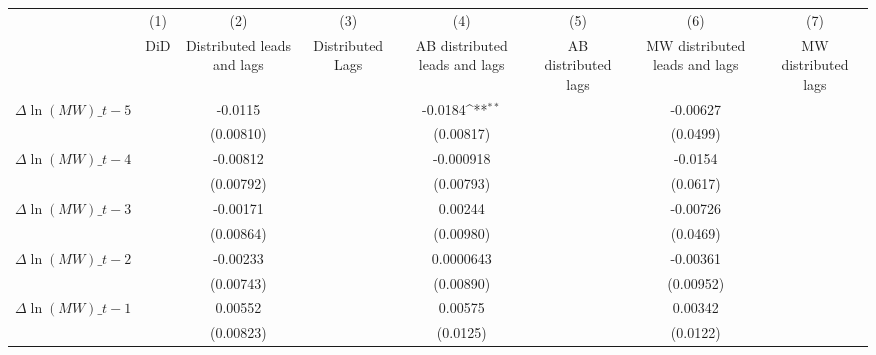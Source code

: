 {
\def\sym#1{\ifmmode^{#1}\else\(^{#1}\)\fi}
\begin{tabular}{l*{7}{c}}
\hline\hline
          &\multicolumn{1}{c}{(1)}&\multicolumn{1}{c}{(2)}&\multicolumn{1}{c}{(3)}&\multicolumn{1}{c}{(4)}&\multicolumn{1}{c}{(5)}&\multicolumn{1}{c}{(6)}&\multicolumn{1}{c}{(7)}\\
          &\multicolumn{1}{c}{DiD}&\multicolumn{1}{c}{Distributed leads and lags}&\multicolumn{1}{c}{Distributed Lags}&\multicolumn{1}{c}{AB distributed leads and lags}&\multicolumn{1}{c}{AB distributed lags}&\multicolumn{1}{c}{MW distributed leads and lags}&\multicolumn{1}{c}{MW distributed lags}\\
\hline
$\Delta \ln(MW)\_{t-5}$&                  &  -0.0115         &                  &  -0.0184\sym{**} &                  & -0.00627         &                  \\
          &                  &(0.00810)         &                  &(0.00817)         &                  & (0.0499)         &                  \\
[1em]
$\Delta \ln(MW)\_{t-4}$&                  & -0.00812         &                  &-0.000918         &                  &  -0.0154         &                  \\
          &                  &(0.00792)         &                  &(0.00793)         &                  & (0.0617)         &                  \\
[1em]
$\Delta \ln(MW)\_{t-3}$&                  & -0.00171         &                  &  0.00244         &                  & -0.00726         &                  \\
          &                  &(0.00864)         &                  &(0.00980)         &                  & (0.0469)         &                  \\
[1em]
$\Delta \ln(MW)\_{t-2}$&                  & -0.00233         &                  &0.0000643         &                  & -0.00361         &                  \\
          &                  &(0.00743)         &                  &(0.00890)         &                  &(0.00952)         &                  \\
[1em]
$\Delta \ln(MW)\_{t-1}$&                  &  0.00552         &                  &  0.00575         &                  &  0.00342         &                  \\
          &                  &(0.00823)         &                  & (0.0125)         &                  & (0.0122)         &                  \\

\end{tabular}}
